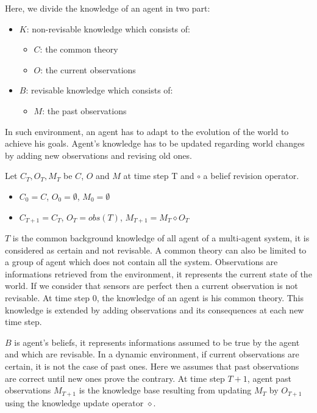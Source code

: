 \documentclass{aamas2012}
\begin{document}
	Here, we divide the knowledge of an agent in two part:
	\begin{itemize}
		\item $K$: non-revisable knowledge which consists of:
		\begin{itemize}
			\item $C$: the common theory
			\item $O$: the current observations
		\end{itemize}
		\item $B$: revisable knowledge which consists of:
		\begin{itemize}
			\item $M$: the past observations 
		\end{itemize}
	\end{itemize}
		
	In such environment, an agent has to adapt to the evolution of the world to achieve his goals.
	Agent's knowledge has to be updated regarding world changes by adding new observations and revising old ones.
	
	Let $C_{T}, O_{T}, M_{T}$ be $C$, $O$ and $M$ at time step T and $\circ$ a belief revision operator.
	\begin{itemize}
		\item $C_{0} = C$, $O_{0} = \emptyset$, $M_{0} = \emptyset$
		\item $C_{T+1} = C_{T}$, $O_{T} = obs(T)$, $M_{T+1} = M_{T} \diamond O_{T}$
	\end{itemize}
	
	$T$ is the common background knowledge of all agent of a multi-agent system, it is considered as certain and not revisable.
	A common theory can also be limited to a group of agent which does not contain all the system.
	Observations are informations retrieved from the environment, it represents the current state of the world.
	If we consider that sensors are perfect then a current observation is not revisable.
	At time step 0, the knowledge of an agent is his common theory.
	This knowledge is extended by adding observations and its consequences at each new time step.

	$B$ is agent's beliefs, it represents informations assumed to be true by the agent and which are revisable.
	In a dynamic environment, if current observations are certain, it is not the case of past ones.
	Here we assumes that past observations are correct until new ones prove the contrary.
	At time step $T+1$, agent past observations $M_{T+1}$ is the knowledge base resulting from updating $M_{T}$ by $O_{T+1}$ using the knowledge update operator $\diamond$.
\end{document}
